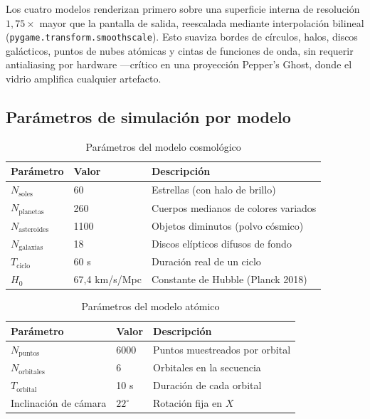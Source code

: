 \documentclass[12pt, a4paper]{article}
\begin{document}
Los cuatro modelos renderizan primero sobre una superficie interna de
resolución $1{,}75\times$ mayor que la pantalla de salida, reescalada
mediante interpolación bilineal (\texttt{pygame.transform.smoothscale}).
Esto suaviza bordes de círculos, halos, discos galácticos, puntos de
nubes atómicas y cintas de funciones de onda, sin requerir
antialiasing por hardware —crítico en una proyección Pepper's Ghost,
donde el vidrio amplifica cualquier artefacto.

\subsection{Parámetros de simulación por modelo}

\begin{table}[H]
  \centering
  \caption{Parámetros del modelo cosmológico}
  \begin{tabular}{lll}
    \toprule
    Parámetro & Valor & Descripción \\
    \midrule
    $N_{\text{soles}}$       & 60       & Estrellas (con halo de brillo) \\
    $N_{\text{planetas}}$    & 260      & Cuerpos medianos de colores variados \\
    $N_{\text{asteroides}}$  & 1100     & Objetos diminutos (polvo cósmico) \\
    $N_{\text{galaxias}}$    & 18       & Discos elípticos difusos de fondo \\
    $T_{\text{ciclo}}$   & 60 s     & Duración real de un ciclo \\
    $H_0$                & 67,4 km/s/Mpc & Constante de Hubble (Planck 2018) \\
    \bottomrule
  \end{tabular}
  \label{tab:parametros_cosmo}
\end{table}

\begin{table}[H]
  \centering
  \caption{Parámetros del modelo atómico}
  \begin{tabular}{lll}
    \toprule
    Parámetro & Valor & Descripción \\
    \midrule
    $N_{\text{puntos}}$    & 6000   & Puntos muestreados por orbital \\
    $N_{\text{orbitales}}$ & 6      & Orbitales en la secuencia \\
    $T_{\text{orbital}}$   & 10 s   & Duración de cada orbital \\
    Inclinación de cámara & $22^\circ$  & Rotación fija en $X$ \\
    \bottomrule
  \end{tabular}
  \label{tab:parametros_atomico}
\end{table}
\end{document}
